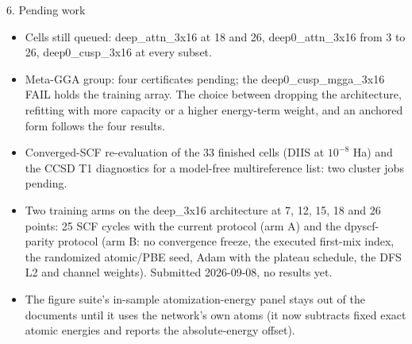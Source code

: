 \begin{frame}{6. Pending work}
  \small
  \begin{itemize}
    \item Cells still queued: deep\_attn\_3x16 at 18 and 26, deep0\_attn\_3x16 from 3 to 26, deep0\_cusp\_3x16 at every subset.
    \item Meta-GGA group: four certificates pending; the deep0\_cusp\_mgga\_3x16 FAIL holds the training array. The choice between dropping the architecture, refitting with more capacity or a higher energy-term weight, and an anchored form follows the four results.
    \item Converged-SCF re-evaluation of the 33 finished cells (DIIS at $10^{-8}$ Ha) and the CCSD T1 diagnostics for a model-free multireference list: two cluster jobs pending.
    \item Two training arms on the deep\_3x16 architecture at 7, 12, 15, 18 and 26 points: 25 SCF cycles with the current protocol (arm A) and the dpyscf-parity protocol (arm B: no convergence freeze, the executed first-mix index, the randomized atomic/PBE seed, Adam with the plateau schedule, the DFS L2 and channel weights). Submitted 2026-09-08, no results yet.
    \item The figure suite's in-sample atomization-energy panel stays out of the documents until it uses the network's own atoms (it now subtracts fixed exact atomic energies and reports the absolute-energy offset).
  \end{itemize}
\end{frame}
